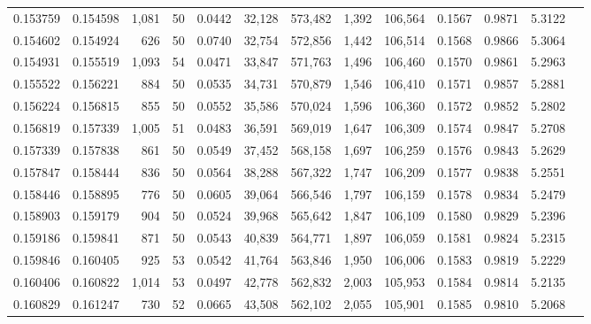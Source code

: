 \begin{tabular}{rrrrrrrrrrrrr}
0.153759 & 0.154598 & 1,081 &  50 &                                     0.0442 &  32,128 & 573,482 &   1,392 & 106,564 & 0.1567 & 0.9871 & 5.3122 \\
0.154602 & 0.154924 &   626 &  50 &                                     0.0740 &  32,754 & 572,856 &   1,442 & 106,514 & 0.1568 & 0.9866 & 5.3064 \\
0.154931 & 0.155519 & 1,093 &  54 &                                     0.0471 &  33,847 & 571,763 &   1,496 & 106,460 & 0.1570 & 0.9861 & 5.2963 \\
0.155522 & 0.156221 &   884 &  50 &                                     0.0535 &  34,731 & 570,879 &   1,546 & 106,410 & 0.1571 & 0.9857 & 5.2881 \\
0.156224 & 0.156815 &   855 &  50 &                                     0.0552 &  35,586 & 570,024 &   1,596 & 106,360 & 0.1572 & 0.9852 & 5.2802 \\
0.156819 & 0.157339 & 1,005 &  51 &                                     0.0483 &  36,591 & 569,019 &   1,647 & 106,309 & 0.1574 & 0.9847 & 5.2708 \\
0.157339 & 0.157838 &   861 &  50 &                                     0.0549 &  37,452 & 568,158 &   1,697 & 106,259 & 0.1576 & 0.9843 & 5.2629 \\
0.157847 & 0.158444 &   836 &  50 &                                     0.0564 &  38,288 & 567,322 &   1,747 & 106,209 & 0.1577 & 0.9838 & 5.2551 \\
0.158446 & 0.158895 &   776 &  50 &                                     0.0605 &  39,064 & 566,546 &   1,797 & 106,159 & 0.1578 & 0.9834 & 5.2479 \\
0.158903 & 0.159179 &   904 &  50 &                                     0.0524 &  39,968 & 565,642 &   1,847 & 106,109 & 0.1580 & 0.9829 & 5.2396 \\
0.159186 & 0.159841 &   871 &  50 &                                     0.0543 &  40,839 & 564,771 &   1,897 & 106,059 & 0.1581 & 0.9824 & 5.2315 \\
0.159846 & 0.160405 &   925 &  53 &                                     0.0542 &  41,764 & 563,846 &   1,950 & 106,006 & 0.1583 & 0.9819 & 5.2229 \\
0.160406 & 0.160822 & 1,014 &  53 &                                     0.0497 &  42,778 & 562,832 &   2,003 & 105,953 & 0.1584 & 0.9814 & 5.2135 \\
0.160829 & 0.161247 &   730 &  52 &                                     0.0665 &  43,508 & 562,102 &   2,055 & 105,901 & 0.1585 & 0.9810 & 5.2068 \\

\end{tabular}
